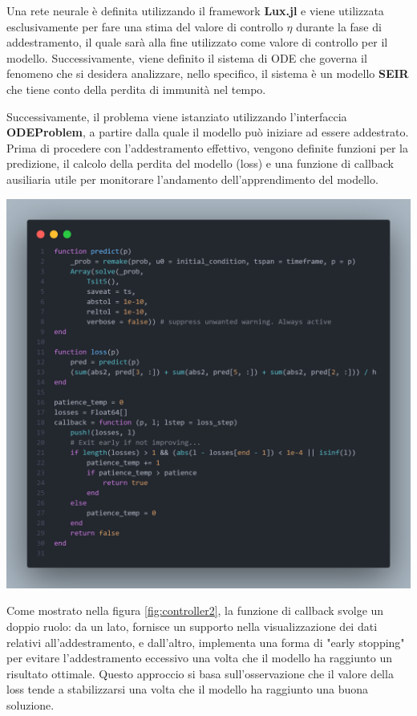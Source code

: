 Una rete neurale è definita utilizzando il framework 
\textbf{Lux.jl} \cite{pal2023lux} e viene utilizzata esclusivamente per 
fare una stima del valore di controllo $\eta$ durante la fase di 
addestramento, il quale sarà alla fine utilizzato come valore di 
controllo per il modello. Successivamente, viene definito il sistema 
di ODE che governa il fenomeno che si desidera analizzare, 
nello specifico, il sistema è un modello \textbf{SEIR} che tiene 
conto della perdita di immunità nel tempo.

Successivamente, il problema viene istanziato utilizzando 
l'interfaccia \textbf{ODEProblem}, a partire dalla quale il modello 
può iniziare ad essere addestrato. Prima di procedere con 
l'addestramento effettivo, vengono definite funzioni per la predizione, 
il calcolo della perdita del modello (loss) e una funzione di callback 
ausiliaria utile per monitorare l'andamento dell'apprendimento del modello.

\begin{minipage}{\linewidth}
	\centering
	\includegraphics[width=\textwidth]{img/controller2.png}
	\label{fig:controller2}
\end{minipage}

Come mostrato nella figura \ref{fig:controller2}, la funzione di 
callback svolge un doppio ruolo: da un lato, fornisce un supporto 
nella visualizzazione dei dati relativi all'addestramento, e dall'altro, 
implementa una forma di "early stopping" per evitare l'addestramento 
eccessivo una volta che il modello ha raggiunto un risultato ottimale. 
Questo approccio si basa sull'osservazione che il valore della loss 
tende a stabilizzarsi una volta che il modello ha raggiunto una buona 
soluzione.

